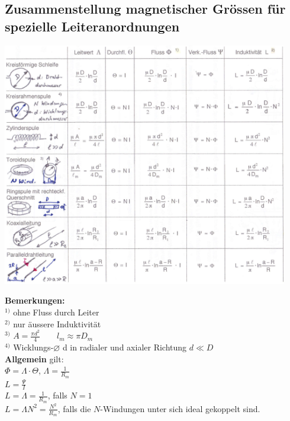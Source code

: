 \subsection{Zusammenstellung magnetischer Grössen für spezielle
Leiteranordnungen}
\begin{minipage}{14cm}
	\includegraphics[width=12.5cm]{./bilder/magn_spez_leiteranordnungen.png} 
\end{minipage}
\begin{minipage}[ht]{5cm}
	\textbf{Bemerkungen:}\\
	$^{1)}$ ohne Fluss durch Leiter\\
	$^{2)}$ nur äussere Induktivität\\
	$^{3)}$ $A=\frac{\pi d^2}{4} \qquad l_m \approx \pi D_m$\\
	$^{4)}$ Wicklungs-$\varnothing$ d in radialer und axialer Richtung $d \ll D$\\
	
	\textbf{Allgemein} gilt:\\
	$\boxed{\Phi=\Lambda \cdot \Theta}$, $\Lambda=\frac{1}{R_m}$\\
	$\boxed{L=\frac{\Psi}{I}}$\\
	$L=\Lambda=\frac{1}{R_m}$, falls $N=1$\\
	$\boxed{L=\Lambda N^2=\frac{N^2}{R_m}}$, falls die $N$-Windungen unter sich ideal
	gekoppelt sind.
\end{minipage}

